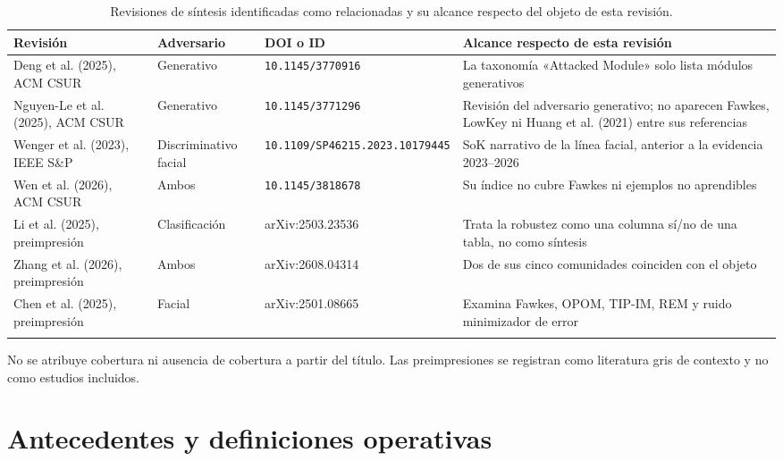 \documentclass[pdflatex,sn-mathphys-num]{sn-jnl}
\newcommand{\br}{\discretionary{}{}{}}
\theoremstyle{thmstyleone}
\theoremstyle{thmstyletwo}
\theoremstyle{thmstylethree}
\begin{document}
\begin{table}[h]
\centering
\caption{Revisiones de síntesis identificadas como relacionadas y su alcance respecto del objeto de esta revisión.}\label{tab:revisiones}
\footnotesize
\begin{tabularx}{\textwidth}{@{}Y{0.85}Y{0.6}Y{0.85}Y{1.7}@{}}
\toprule
Revisión & Adversario & DOI o ID & Alcance respecto de esta revisión \\
\midrule
Deng et al. (2025), ACM CSUR \cite{deng2025survey} & Generativo & \texttt{\scriptsize 10.\br 1145/\br 3770916} & La taxonomía «Attacked Module» solo lista módulos generativos \\
Nguyen-Le et al. (2025), ACM CSUR \cite{nguyenle2025survey} & Generativo & \texttt{\scriptsize 10.\br 1145/\br 3771296} & Revisión del adversario generativo; no aparecen Fawkes, LowKey ni Huang et al. (2021) entre sus referencias \\
Wenger et al. (2023), IEEE S\&P \cite{wenger2023sok} & Discriminativo facial & \texttt{\scriptsize 10.\br 1109/\br SP46215.\br 2023.\br 10179445} & SoK narrativo de la línea facial, anterior a la evidencia 2023--2026 \\
Wen et al. (2026), ACM CSUR \cite{wen2026image} & Ambos & \texttt{\scriptsize 10.\br 1145/\br 3818678} & Su índice no cubre Fawkes ni ejemplos no aprendibles \\
Li et al. (2025), preimpresión \cite{li2025unlearnabledata} & Clasificación & arXiv:2503.23536 & Trata la robustez como una columna sí/no de una tabla, no como síntesis \\
Zhang et al. (2026), preimpresión \cite{zhang2026adversarial} & Ambos & arXiv:2608.04314 & Dos de sus cinco comunidades coinciden con el objeto \\
Chen et al. (2025), preimpresión \cite{chen2025survey} & Facial & arXiv:2501.08665 & Examina Fawkes, OPOM, TIP-IM, REM y ruido minimizador de error \\
\botrule
\end{tabularx}
\par\vspace{3pt}\scriptsize\raggedright No se atribuye cobertura ni ausencia de cobertura a partir del título. Las preimpresiones se registran como literatura gris de contexto y no como estudios incluidos.\par
\end{table}

\section{Antecedentes y definiciones operativas}\label{sec:antecedentes}
\end{document}
